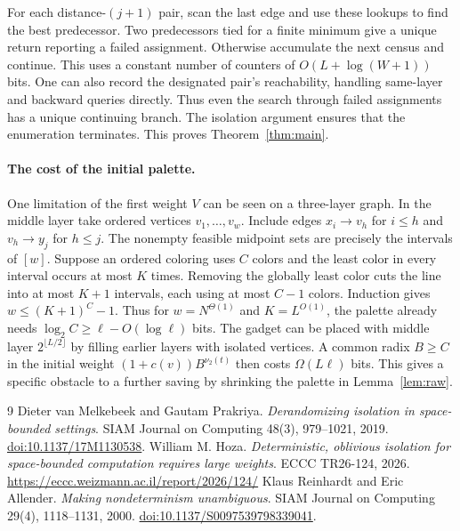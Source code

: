\documentclass[11pt]{article}
\begin{document}
For each distance-$(j+1)$ pair, scan the last edge and use these lookups
to find the best predecessor. Two predecessors tied for a finite minimum give a unique
return reporting a failed assignment. Otherwise accumulate the next
census and continue. This uses a constant number of counters of
$O(L+\log(W+1))$ bits. One can also record the designated pair's reachability,
handling same-layer and backward queries directly. Thus even the search
through failed assignments has a unique continuing branch. The isolation
argument ensures that the enumeration terminates.
This proves Theorem~\ref{thm:main}.

\paragraph{The cost of the initial palette.}
One limitation of the first weight $V$ can be seen on a three-layer
graph. In the middle layer take ordered vertices $v_1,\ldots,v_w$.
Include edges $x_i\to v_h$ for $i\le h$ and $v_h\to y_j$ for $h\le j$.
The nonempty feasible midpoint sets are precisely the intervals of
$[w]$. Suppose an ordered coloring uses $C$ colors and the least color
in every interval occurs at most $K$ times. Removing the globally least
color cuts the line into at most $K+1$ intervals, each using at most
$C-1$ colors. Induction gives $w\le(K+1)^C-1$. Thus for
$w=N^{\Theta(1)}$ and $K=L^{O(1)}$, the palette already needs
$\log_2 C\ge \ell-O(\log\ell)$ bits. The gadget can be placed with
middle layer $2^{\lfloor L/2\rfloor}$ by filling earlier layers with
isolated vertices. A common radix $B\ge C$ in the initial weight
$(1+c(v))B^{\nu_2(t)}$ then costs $\Omega(L\ell)$ bits. This gives a
specific obstacle to a further saving by shrinking the palette in
Lemma~\ref{lem:raw}.

\begin{thebibliography}{9}
 Dieter van Melkebeek and Gautam Prakriya.
\emph{Derandomizing isolation in space-bounded settings}.
SIAM Journal on Computing 48(3), 979--1021, 2019.
\href{https://doi.org/10.1137/17M1130538}{doi:10.1137/17M1130538}.
 William M. Hoza.
\emph{Deterministic, oblivious isolation for space-bounded computation requires large weights}.
ECCC TR26-124, 2026. \url{https://eccc.weizmann.ac.il/report/2026/124/}
 Klaus Reinhardt and Eric Allender.
\emph{Making nondeterminism unambiguous}.
SIAM Journal on Computing 29(4), 1118--1131, 2000.
\href{https://doi.org/10.1137/S0097539798339041}{doi:10.1137/S0097539798339041}.
\end{thebibliography}
\end{document}
